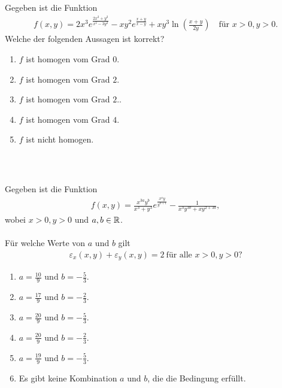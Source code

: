 \subsection*{}
Gegeben ist die Funktion
\begin{align*}
	f(x,y) 
	=
	2 x^3 e^{\frac{ 2x^2+y^2}{x^2 - 3y^2 }}
	-
	xy^2 e^{\frac{x+y}{x-y}}
	+
	x y^3 \ln \left( \frac{x+y }{2y} \right)
	\quad \textrm{für } x>0,y>0.
\end{align*}
Welche der folgenden Aussagen ist korrekt?
\renewcommand{\labelenumi}{(\alph{enumi})}
\begin{enumerate}
	\item
	$ f  $ ist homogen vom Grad $ 0 $.
	\item
	$ f  $ ist homogen vom Grad $ 2 $.
	\item
	$ f  $ ist homogen vom Grad $ 2 $..	
	\item 
	$ f  $ ist homogen vom Grad $ 4 $.
	\item
	$ f $ ist nicht homogen.
\end{enumerate}
\ \\
\subsection*{}
Gegeben ist die Funktion
\begin{align*}
	f(x,y)
	=
	\frac{x^{3a} y^b}{x^3 +y^3} e^{\frac{x^a y}{y^{a+1}}}
	- 
	\frac{1}{x^3 y^{3b} + x y^{2 + 3b}},
\end{align*}
wobei $ x > 0, y > 0 $ und $ a,b \in \mathbb{R} $.\\
\\
Für welche Werte von $ a $ und $ b $ gilt
\begin{align*}
	\varepsilon_x(x,y) + \varepsilon_y(x,y) = 2 \ \textrm{für alle } x>0, y>0\textrm{?}
\end{align*}
\renewcommand{\labelenumi}{(\alph{enumi})}
\begin{enumerate}
	\item 
	$a = \frac{10}{9}$ und $ b=-\frac{5}{3} $.
	\item
	$a = \frac{17}{9}$ und $ b=-\frac{2}{3} $.
	\item
	$a = \frac{20}{9}$ und $ b=-\frac{5}{3} $.
	\item
	$a = \frac{20}{9}$ und $ b=-\frac{2}{3} $.
	\item
	$a = \frac{19}{9}$ und $ b=-\frac{5}{3} $.
	\item
	Es gibt keine Kombination $ a $ und $ b $, die die Bedingung erfüllt.
\end{enumerate}